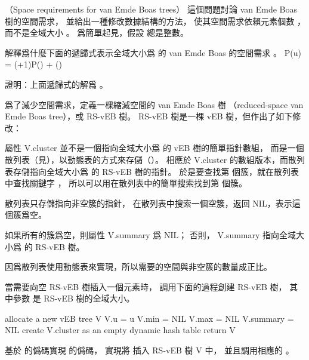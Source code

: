 \startsubject[
  title={Problems},
]

（Space requirements for van Emde Boas trees）
這個問題討論 van Emde Boas 樹的空間需求，
並給出一種修改數據結構的方法，
使其空間需求依賴元素個數 ，
而不是全域大小 。
爲簡單起見，假設  總是整數。

\startigBase[a]\startitem
解釋爲什麼下面的遞歸式表示全域大小爲  的 van Emde Boas 的空間需求 。
\startformula
P(u) = (+1)P() + \Theta()
\stopformula

\stopitem\stopigBase

\startANSWER
{}
\stopANSWER

\startigBase[continue]\startitem
證明：上面遞歸式的解爲 。
\stopitem\stopigBase

\startANSWER
{}
\stopANSWER

爲了減少空間需求，定義一棵{\EMP 縮減空間的 van Emde Boas 樹}
（reduced-space van Emde Boas tree），或 {\EMP RS-vEB 樹}。
 RS-vEB 樹是一棵 vEB 樹，但作出了如下修改：
\startigNum[1]
\item 屬性 V.cluster 並不是一個指向全域大小爲  的 vEB 樹的簡單指針數組，
而是一個散列表（見），以動態表的方式來存儲（）。
相應於 V.cluster 的數組版本，而散列表存儲指向全域大小爲  的 RS-vEB 樹的指針。
於是要查找第  個簇，就在散列表中查找關鍵字 ，
所以可以用在散列表中的簡單搜索找到第  個簇。

\item 散列表只存儲指向非空簇的指針，
在散列表中搜索一個空簇，返回 NIL，表示這個簇爲空。

\item 如果所有的簇爲空，則屬性 V.summary 爲 NIL；
否則， V.summary 指向全域大小爲  的 RS-vEB 樹。
\stopigNum

因爲散列表使用動態表來實現，所以需要的空間與非空簇的數量成正比。

當需要向空 RS-vEB 樹插入一個元素時，
調用下面的過程創建 RS-vEB 樹，
其中參數  是 RS-vEB 樹的全域大小。

\startCLRS
allocate a new vEB tree V
V.u = u
V.min = NIL
V.max = NIL
V.summary = NIL
create V.cluster as an empty dynamic hash table
return V
\stopCLRS

\startigBase[continue]\startitem
基於  的僞碼實現  的僞碼，
實現將  插入 RS-vEB 樹 V 中，
並且調用相應的 。
\stopitem\stopigBase

